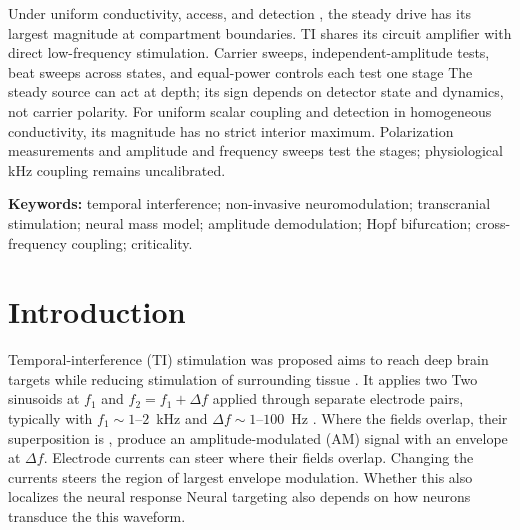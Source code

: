 \documentclass[11pt,a4paper]{article}
\providecommand{\DIFaddtex}[1]{{\protect\color{blue} \sf #1}} %
\providecommand{\DIFdeltex}[1]{{\protect\color{red} \scriptsize #1}} %
\providecommand{\DIFaddbegin}{} %
\providecommand{\DIFaddend}{} %
\providecommand{\DIFdelbegin}{} %
\providecommand{\DIFdelend}{} %
\providecommand{\DIFadd}[1]{\texorpdfstring{\DIFaddtex{#1}}{#1}} %
\providecommand{\DIFdel}[1]{\texorpdfstring{\DIFdeltex{#1}}{}} %
\begin{document}
\DIFdelbegin \DIFdel{Under uniform conductivity,
access,
and detection , the steady drive has its largest magnitude at compartment boundaries. TI shares
its circuit amplifier with direct low-frequency stimulation. Carrier sweeps,
independent-amplitude tests, beat sweeps across states, and equal-power controls
each test one stage}\DIFdelend \DIFaddbegin \DIFadd{The steady source can act at depth; its sign depends on detector state and dynamics,
not carrier polarity. For uniform scalar coupling and detection in homogeneous
conductivity, its magnitude has no strict interior maximum. Polarization measurements and amplitude and frequency sweeps test the
stages; physiological kHz coupling remains uncalibrated}\DIFaddend .
\fi

\smallskip
\noindent\textbf{Keywords:} temporal interference; non-invasive neuromodulation;
transcranial stimulation; neural mass model; amplitude demodulation; Hopf bifurcation;
cross-frequency coupling; criticality.

\clearpage
\tableofcontents
\clearpage

\section{Introduction}
Temporal-interference (TI) stimulation \DIFdelbegin \DIFdel{was proposed }\DIFdelend \DIFaddbegin \DIFadd{aims }\DIFaddend to reach deep brain targets while
reducing stimulation of surrounding tissue \cite{grossman2017}. \DIFdelbegin \DIFdel{It applies two }\DIFdelend \DIFaddbegin \DIFadd{Two }\DIFaddend sinusoids at
$f_1$ and $f_2=f_1+\Delta f$ \DIFaddbegin \DIFadd{applied }\DIFaddend through separate electrode pairs, typically with
$f_1\sim1$--$2$~kHz and $\Delta f\sim1$--$100$~Hz\DIFdelbegin \DIFdel{. Where the fields overlap, their
superposition is }\DIFdelend \DIFaddbegin \DIFadd{, produce }\DIFaddend an amplitude-modulated
(AM) signal \DIFdelbegin \DIFdel{with an envelope at $\Delta f$. Electrode currents can steer }\DIFdelend \DIFaddbegin \DIFadd{where their fields overlap. Changing the currents steers }\DIFaddend the region
of largest envelope modulation. \DIFdelbegin \DIFdel{Whether this
also localizes the neural response }\DIFdelend \DIFaddbegin \DIFadd{Neural targeting also }\DIFaddend depends on how neurons
transduce \DIFdelbegin \DIFdel{the }\DIFdelend \DIFaddbegin \DIFadd{this }\DIFaddend waveform.
\end{document}
